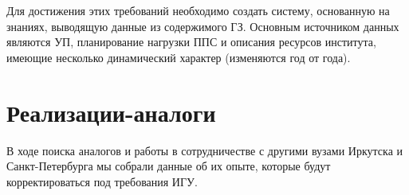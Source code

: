 \documentclass[
]{aiitart}
\begin{document}






Для достижения этих требований необходимо создать систему, основанную на знаниях, выводящую данные из содержимого ГЗ. Основным источником данных являются УП, планирование нагрузки ППС и описания ресурсов института, имеющие несколько динамический характер (изменяются год от года).

\section{Реализации-аналоги}

В ходе поиска аналогов и работы в сотрудничестве с другими вузами Иркутска и Санкт-Петербурга мы собрали данные об их опыте, которые будут корректироваться под требования ИГУ.
\end{document}
